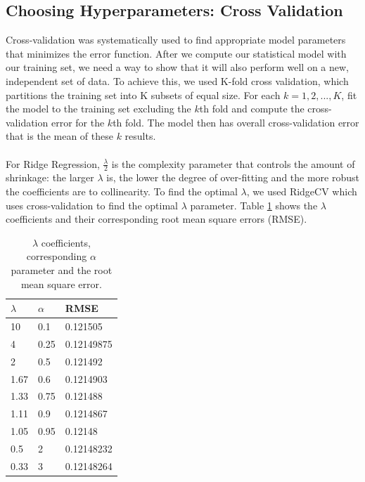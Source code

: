 \documentclass[letterpaper]{article}
\begin{document}
\subsection{Choosing Hyperparameters: Cross Validation}
Cross-validation was systematically used to find appropriate model parameters that minimizes the error function. After we compute our statistical model with our training set, we need a way to show that it will also perform well on a new, independent set of data. To achieve this, we used K-fold cross validation, which partitions the training set into K subsets of equal size. For each $k = 1,2,...,K$, fit the model to the training set excluding the $k$th fold and compute the cross-validation error for the $k$th fold. The model then has overall cross-validation error that is the mean of these $k$ results. \\
\\
\noindent For Ridge Regression, $\frac{\lambda}{2}$ is the complexity parameter that controls the amount of shrinkage: the larger $\lambda$ is, the lower the degree of over-fitting and the more robust the coefficients are to collinearity. To find the optimal $\lambda$, we used RidgeCV which uses cross-validation to find the optimal $\lambda$ parameter. Table \ref{tab:parameters} shows the $\lambda$ coefficients and their corresponding root mean square errors (RMSE).

\begin{table}[h!]
\begin{center}
    \begin{tabular}{ | p{1.5cm} | p{1.5cm} | p{2cm} |}
    \hline
    $\lambda$ & $\alpha$ & RMSE \\ \hline
    10 & 0.1 & 0.121505 \\ \hline
    4 & 0.25 & 0.12149875 \\ \hline
    2 & 0.5 & 0.121492 \\ \hline
    1.67 & 0.6 & 0.1214903 \\ \hline
    1.33 & 0.75 & 0.121488 \\ \hline
    1.11 & 0.9 & 0.1214867 \\ \hline
    1.05 & 0.95 & 0.12148 \\ \hline
    0.5 & 2 & 0.12148232 \\ \hline
    0.33 & 3 & 0.12148264 \\ \hline
    \end{tabular}
    \caption{$\lambda$ coefficients, corresponding $\alpha$ parameter and the  root mean square error.}
    \label{tab:parameters}
\end{center}
\end{table}
\end{document}
